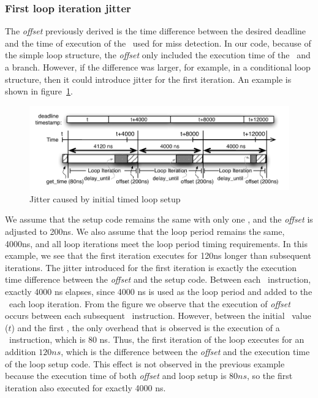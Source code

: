 \subsubsection{First loop iteration jitter}
The \emph{offset} previously derived is the time difference between the desired deadline and the time of execution of the \gettime\ used for miss detection.  
In our code, because of the simple loop structure, the \emph{offset} only included the execution time of the \delayuntil\ and a branch. 
However, if the difference was larger, for example, in a conditional loop structure, then it could introduce jitter for the first iteration.
An example is shown in figure~\ref{fig:setup_look_timing}.
\begin{figure}[h]
  \vspace{-3mm}
  \begin{center}
    \includegraphics[scale=.9]{figs/setup_loop_timing}
  \end{center}
  \vspace{-3mm}
  \caption{Jitter caused by initial timed loop setup}
  \label{fig:setup_look_timing}
\end{figure}
We assume that the setup code remains the same with only one \gettime, and the \emph{offset} is adjusted to 200ns.
We also assume that the loop period remains the same, 4000ns, and all loop iterations meet the loop period timing requirements. 
In this example, we see that the first iteration executes for 120ns longer than subsequent iterations.
The jitter introduced for the first iteration is exactly the execution time difference between the \emph{offset} and the setup code.  
Between each \delayuntil\ instruction, exactly 4000 ns elapses, since 4000 ns is used as the loop period and added to the \deadlinet\ each loop iteration.   
From the figure we observe that the execution of \emph{offset} occurs between each subsequent \delayuntil\ instruction.
However, between the initial \deadlinet\ value ($t$) and the first \delayuntil, the only overhead that is observed is the execution of a \gettime\ instruction, which is 80 ns. 
Thus, the first iteration of the loop executes for an addition $120ns$, which is the difference between the \emph{offset} and the execution time of the loop setup code.
This effect is not observed in the previous example because the execution time of both \emph{offset} and loop setup is $80 ns$, so the first iteration also executed for exactly 4000 ns.   

